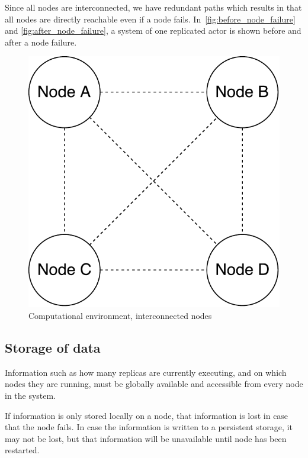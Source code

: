 \documentclass{cslthse-msc}
\begin{document}
Since all nodes are interconnected, we have redundant paths which results in that all nodes are directly reachable even if a node fails. In~\cref{fig:before_node_failure} and \cref{fig:after_node_failure}, a system of one replicated actor is shown before and after a node failure.

\begin{figure}[!hbt]
\centering
\includegraphics[scale=0.5]{images/computational_environment.pdf}
\caption[Computational environment]{Computational environment, interconnected nodes} \label{fig:computational_environment}
\end{figure}

\subsection{Storage of data} \label{subsec:design_storage}
Information such as how many replicas are currently executing, and on which nodes they are running, must be globally available and accessible from every node in the system.

If information is only stored locally on a node, that information is lost in case that the node fails. In case the information is written to a persistent storage, it may not be lost, but that information will be unavailable until node has been restarted. 
\end{document}
